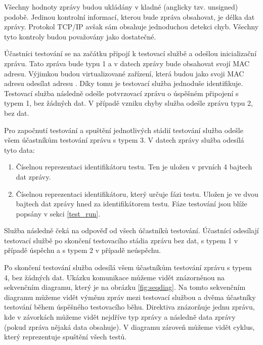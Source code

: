 Všechny hodnoty zprávy budou ukládány v kladné (anglicky tzv. unsigned) podobě. Jedinou kontrolní informací, kterou bude zpráva obsahovat, je délka dat zprávy. Protokol TCP/IP avšak sám obsahuje jednoduchou detekci chyb. Všechny tyto kontroly budou považovány jako dostatečné.

Účastníci testování se na začátku připojí k testovací službě a odešlou inicializační zprávu. Tato zpráva bude typu 1 a v datech zprávy bude obsahovat svojí MAC adresu. Výjimkou budou virtualizované zařízení, která budou jako svoji MAC adresu odesílat adresu . Díky tomu je testovací služba jednoduše identifikuje. Testovací služba následně odešle potvrzovací zprávu o úspěšném připojení s typem 1, bez žádných dat. V případě vzniku chyby služba odešle zprávu typu 2, bez dat. 

Pro započnutí testování a spuštění jednotlivých stádií testování služba odešle všem účastníkům testování zprávu s typem 3. V datech zprávy služba odesílá tyto data:

\begin{enumerate}
    \item Číselnou reprezentaci identifikátoru testu. Ten je uložen v prvních 4 bajtech dat zprávy.
    \item Číselnou reprezentaci identifikátoru, který určuje fázi testu. Uložen je ve dvou bajtech dat zprávy hned za identifikátorem testu. Fáze testování jsou blíže popsány v sekci \ref{test_run}.
\end{enumerate}

Služba následně čeká na odpověď od všech účastníků testování. Účastnící odesílají testovací službě po skončení testovacího stádia zprávu bez dat, s typem 1 v případě úspěchu a s typem 2 v případě neúspěchu. 

Po skončení testování služba odesílá všem účastníkům testování zprávu s typem 4, bez žádných dat. Ukázku komunikace můžeme vidět znázorněnou na sekvenčním diagramu, který je na obrázku \ref{fig:seqdiag}. Na tomto sekvenčním diagramu můžeme vidět výměnu zpráv mezi testovací službou a dvěma účastníky testování během úspěšného testovacího běhu. Direktiva  znázorňuje jednu zprávu, kde v závorkách můžeme vidět nejdříve typ zprávy a následně data zprávy (pokud zpráva nějaká data obsahuje). V diagramu zároveň můžeme vidět cyklus, který reprezentuje spuštění všech testů.

